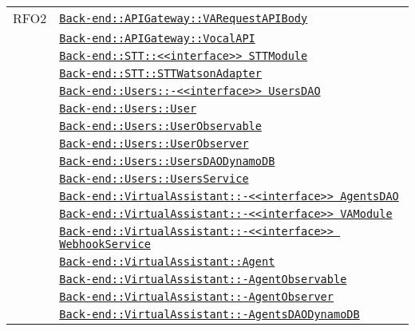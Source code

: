 \begin{longtable}{|>{\centering}m{3cm}|m{10cm}<{\centering}|}
RFO2 & \hyperref[Back-end::APIGateway::VARequestAPIBody]{\texttt{Back-end::APIGateway::VARequestAPIBody}}\\
& \hyperref[Back-end::APIGateway::VocalAPI]{\texttt{Back-end::APIGateway::VocalAPI}}\\
& \hyperref[Back-end::STT::<<interface>> STTModule]{\texttt{Back-end::STT::<<interface>> STTModule}}\\
& \hyperref[Back-end::STT::STTWatsonAdapter]{\texttt{Back-end::STT::STTWatsonAdapter}}\\
& \hyperref[Back-end::Users::<<interface>> UsersDAO]{\texttt{Back-end::Users::-\linebreak <<interface>> UsersDAO}}\\
& \hyperref[Back-end::Users::User]{\texttt{Back-end::Users::User}}\\
& \hyperref[Back-end::Users::UserObservable]{\texttt{Back-end::Users::UserObservable}}\\
& \hyperref[Back-end::Users::UserObserver]{\texttt{Back-end::Users::UserObserver}}\\
& \hyperref[Back-end::Users::UsersDAODynamoDB]{\texttt{Back-end::Users::UsersDAODynamoDB}}\\
& \hyperref[Back-end::Users::UsersService]{\texttt{Back-end::Users::UsersService}}\\
& \hyperref[Back-end::VirtualAssistant::<<interface>> AgentsDAO]{\texttt{Back-end::VirtualAssistant::-\linebreak <<interface>> AgentsDAO}}\\
& \hyperref[Back-end::VirtualAssistant::<<interface>> VAModule]{\texttt{Back-end::VirtualAssistant::-\linebreak <<interface>> VAModule}}\\
& \hyperref[Back-end::VirtualAssistant::<<interface>> WebhookService]{\texttt{Back-end::VirtualAssistant::-\linebreak <<interface>> WebhookService}}\\
& \hyperref[Back-end::VirtualAssistant::Agent]{\texttt{Back-end::VirtualAssistant::Agent}}\\
& \hyperref[Back-end::VirtualAssistant::AgentObservable]{\texttt{Back-end::VirtualAssistant::-\linebreak AgentObservable}}\\
& \hyperref[Back-end::VirtualAssistant::AgentObserver]{\texttt{Back-end::VirtualAssistant::-\linebreak AgentObserver}}\\
& \hyperref[Back-end::VirtualAssistant::AgentsDAODynamoDB]{\texttt{Back-end::VirtualAssistant::-\linebreak AgentsDAODynamoDB}}\\

\end{longtable}
